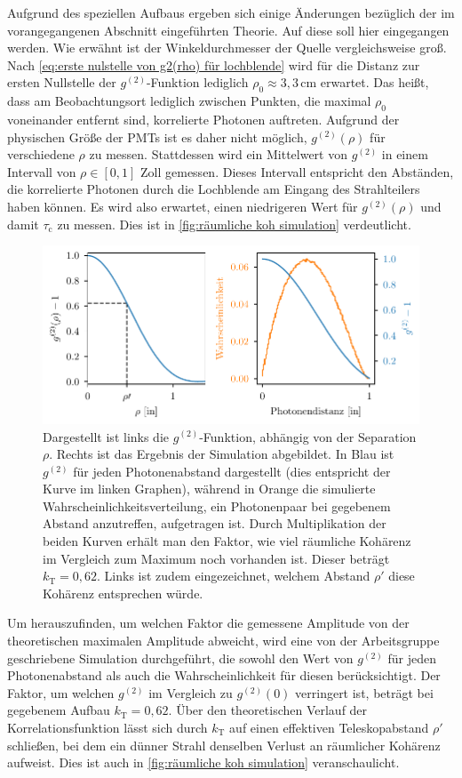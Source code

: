Aufgrund des speziellen Aufbaus ergeben sich einige Änderungen bezüglich der im vorangegangenen Abschnitt eingeführten Theorie. 
Auf diese soll hier eingegangen werden. 
Wie erwähnt ist der Winkeldurchmesser der Quelle vergleichsweise groß. 
Nach \autoref{eq:erste nulstelle von g2(rho) für lochblende} wird für die Distanz zur ersten Nullstelle der $g^{(2)}$-Funktion lediglich $\rho_0\approx3{,}3\,\mathrm{cm}$ erwartet. 
Das heißt, dass am Beobachtungsort lediglich zwischen Punkten, die maximal $\rho_0$ voneinander entfernt sind, korrelierte Photonen auftreten. 
Aufgrund der physischen Größe der PMTs ist es daher nicht möglich, $g^{(2)}(\rho)$ für verschiedene $\rho$ zu messen. 
Stattdessen wird ein Mittelwert von $g^{(2)}$ in einem Intervall von $\rho\in[0,1]$ Zoll gemessen. 
Dieses Intervall entspricht den Abständen, die korrelierte Photonen durch die Lochblende am Eingang des Strahlteilers haben können. 
Es wird also erwartet, einen niedrigeren Wert für $g^{(2)}(\rho)$ und damit $\tau_{\mathrm{c}}$ zu messen. 
Dies ist in \autoref{fig:räumliche koh simulation} verdeutlicht. 
\begin{figure}[h]
    \centering
    \includegraphics{images/Aufbau/g2(rho).pdf}
    \caption{Dargestellt ist links die $g^{(2)}$-Funktion, abhängig von der Separation $\rho$. Rechts ist das Ergebnis der Simulation abgebildet. In Blau ist $g^{(2)}$ für jeden Photonenabstand dargestellt (dies entspricht der Kurve im linken Graphen), während in Orange die simulierte Wahrscheinlichkeitsverteilung, ein Photonenpaar bei gegebenem Abstand anzutreffen, aufgetragen ist. Durch Multiplikation der beiden Kurven erhält man den Faktor, wie viel räumliche Kohärenz im Vergleich zum Maximum noch vorhanden ist. Dieser beträgt $k_\mathrm{T}=0{,}62$. Links ist zudem eingezeichnet, welchem Abstand $\rho\prime$ diese Kohärenz entsprechen würde. }
    \label{fig:räumliche koh simulation}
\end{figure}
Um herauszufinden, um welchen Faktor die gemessene Amplitude von der theoretischen maximalen Amplitude abweicht, wird eine von der Arbeitsgruppe geschriebene Simulation durchgeführt, die sowohl den Wert von $g^{(2)}$ für jeden Photonenabstand als auch die Wahrscheinlichkeit für diesen berücksichtigt. 
Der Faktor, um welchen $g^{(2)}$ im Vergleich zu $g^{(2)}(0)$ verringert ist, beträgt bei gegebenem Aufbau $k_\mathrm{T}=0{,}62$. 
Über den theoretischen Verlauf der Korrelationsfunktion lässt sich durch $k_\mathrm{T}$ auf einen effektiven Teleskopabstand $\rho\prime$ schließen, bei dem ein dünner Strahl denselben Verlust an räumlicher Kohärenz aufweist. 
Dies ist auch in \autoref{fig:räumliche koh simulation} veranschaulicht. \\

